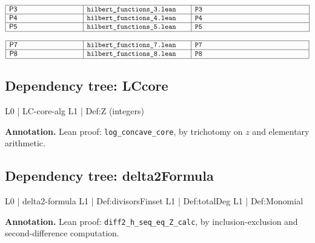 \documentclass[11pt,reqno]{amsart}
\begin{document}
\begin{center}
$%
\begin{array}{|m{3.5cm}|m{5cm}|m{5.5cm}|}
\hline
\text{\textsf{P3}} & \text{\texttt{hilbert\_functions\_3.lean}} & \text{%
\texttt{P3}} \\ \hline
\text{\textsf{P4}} & \text{\texttt{hilbert\_functions\_4.lean}} & \text{%
\texttt{P4}} \\ \hline
\text{\textsf{P5}} & \text{\texttt{hilbert\_functions\_5.lean}} & \text{%
\texttt{P5}} \\ \hline
\end{array}%
$

$%
\begin{array}{|m{3.5cm}|m{5cm}|m{5.5cm}|}
\hline
\text{\textsf{P7}} & \text{\texttt{hilbert\_functions\_7.lean}} & \text{%
\texttt{P7}} \\ \hline
\text{\textsf{P8}} & \text{\texttt{hilbert\_functions\_8.lean}} & \text{%
\texttt{P8}} \\ \hline
\end{array}%
$
\end{center}

\medskip

\subsection*{Dependency tree: \textsf{LCcore}}

\noindent%
\begin{minipage}[t]{0.48\linewidth}
	\vspace{0pt}
	\begin{verbatimbox}
		L0 | LC-core-alg
		L1 |   Def:Z (integers)
	\end{verbatimbox}
\end{minipage}\hfill 
\begin{minipage}[t]{0.48\linewidth}
	\vspace{0pt}
	\textbf{Annotation.} Lean proof: \texttt{log\_concave\_core}, by trichotomy on $z$ and elementary arithmetic.
\end{minipage}

\medskip

\subsection*{Dependency tree: \textsf{delta2Formula}}

\noindent%
\begin{minipage}[t]{0.48\linewidth}
	\vspace{0pt}
	\begin{verbatimbox}
		L0 | delta2-formula
		L1 |   Def:divisorsFinset
		L1 |   Def:totalDeg
		L1 |   Def:Monomial
	\end{verbatimbox}
\end{minipage}\hfill 
\begin{minipage}[t]{0.48\linewidth}
	\vspace{0pt}
	\textbf{Annotation.} Lean proof: \texttt{diff2\_h\_seq\_eq\_Z\_calc}, by inclusion-exclusion and second-difference computation.
\end{minipage}
\end{document}
